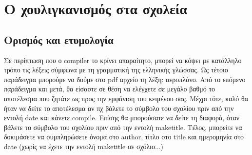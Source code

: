 \documentclass[12pt,a4paper]{book}
\begin{document}
\section*{Ο χουλιγκανισμός στα σχολεία}
\subsection*{Ορισμός και ετυμολογία}
\makeatletter\@openrightfalse
Σε περίπτωση που ο compiler το κρίνει απαραίτητο, μπορεί
να κόψει με κατάλληλο τρόπο τις λέξεις σύμφωνα με τη γραμματική της ελληνικής γλώσσας. Ως τέτοιο παράδειγμα μπορούμε να δούμε στο pdf αρχείο τη λέξη: αεροπλάνο.
Από το επόμενο παράδειγμα και μετά, θα είσαστε σε θέση να ελέγχετε σε μεγάλο
βαθμό το αποτέλεσμα που ζητάτε ως προς την εμφάνιση του κειμένου σας.
Μέχρι τότε, καλό θα ήταν να δείτε το αποτέλεσμα αν πχ βάλετε το σύμβολο του σχολίου πριν από την
εντολή date και κάνετε compile. Επίσης θα μπορούσατε να δείτε τη διαφορά, όταν βάλετε το σύμβολο του σχολίου πριν από την
εντολή maketitle. Τέλος, μπορείτε να δοκιμάσετε να συμπληρώσετε όνομα στο author, τίτλο στο title
και ημερομηνία στο date (χωρίς να έχετε την εντολή maketitle σε σχόλιο...)
\end{document}
